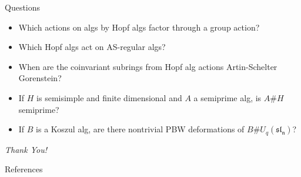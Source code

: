 \documentclass{beamer}
\begin{document}
\begin{frame}{Questions}

\begin{itemize}
    \item<1-> Which actions on algs by Hopf algs factor through a group action?
    \item<2-> Which Hopf algs act on AS-regular algs?
    \item<3-> When are the coinvariant subrings from Hopf alg actions Artin-Schelter Gorenstein?
    \item<4-> If $H$ is semisimple and finite dimensional and $A$ a semiprime alg, is $A\#H$ semiprime?
    \item<5-> If $B$ is a Koszul alg, are there nontrivial PBW deformations of $B\# U_q(\mathfrak{sl_n})$?
\end{itemize}

\end{frame}

\begin{frame}{}
  \centering \Large
  \emph{Thank You!}
\end{frame}

\begin{frame}[allowframebreaks]{References}

        \nocite{*}                        %
        \printbibliography[heading=none]                %

\end{frame}
\end{document}
